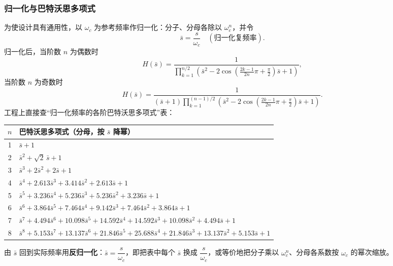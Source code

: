 \subsubsection{归一化与巴特沃思多项式}
为使设计具有通用性，以 $\omega_c$ 为参考频率作归一化：分子、分母各除以 $\omega_c^n$，并令
\begin{equation}
\bar{s}=\frac{s}{\omega_c}\quad(\text{归一化复频率}).
\end{equation}
归一化后，当阶数 $n$ 为偶数时
\begin{equation}
H(\bar{s})=\frac{1}{\displaystyle\prod_{k=1}^{n/2}\left(\bar{s}^2-2\cos\!\left(\frac{2k-1}{2n}\pi+\frac{\pi}{2}\right)\bar{s}+1\right)},
\end{equation}
当阶数 $n$ 为奇数时
\begin{equation}
H(\bar{s})=\frac{1}{(\bar{s}+1)\displaystyle\prod_{k=1}^{(n-1)/2}\left(\bar{s}^2-2\cos\!\left(\frac{2k-1}{2n}\pi+\frac{\pi}{2}\right)\bar{s}+1\right)} .
\end{equation}
工程上直接查“归一化频率的各阶巴特沃思多项式”表：
\begin{center}
\renewcommand{\arraystretch}{1.2}
\small
\begin{tabular}{cl}
\toprule
$n$ & 巴特沃思多项式（分母，按 $\bar{s}$ 降幂） \\
\midrule
1 & $\bar{s}+1$ \\
2 & $\bar{s}^2+\sqrt{2}\,\bar{s}+1$ \\
3 & $\bar{s}^3+2\bar{s}^2+2\bar{s}+1$ \\
4 & $\bar{s}^4+2.613\bar{s}^3+3.414\bar{s}^2+2.613\bar{s}+1$ \\
5 & $\bar{s}^5+3.236\bar{s}^4+5.236\bar{s}^3+5.236\bar{s}^2+3.236\bar{s}+1$ \\
6 & $\bar{s}^6+3.864\bar{s}^5+7.464\bar{s}^4+9.142\bar{s}^3+7.464\bar{s}^2+3.864\bar{s}+1$ \\
7 & $\bar{s}^7+4.494\bar{s}^6+10.098\bar{s}^5+14.592\bar{s}^4+14.592\bar{s}^3+10.098\bar{s}^2+4.494\bar{s}+1$ \\
8 & $\bar{s}^8+5.153\bar{s}^7+13.137\bar{s}^6+21.846\bar{s}^5+25.688\bar{s}^4+21.846\bar{s}^3+13.137\bar{s}^2+5.153\bar{s}+1$ \\
\bottomrule
\end{tabular}
\end{center}
由 $\bar{s}$ 回到实际频率用\textbf{反归一化}：$\bar{s}=\dfrac{s}{\omega_c}$，即把表中每个 $\bar{s}$ 换成 $\dfrac{s}{\omega_c}$，或等价地把分子乘以 $\omega_c^n$、分母各系数按 $\omega_c$ 的幂次缩放。

